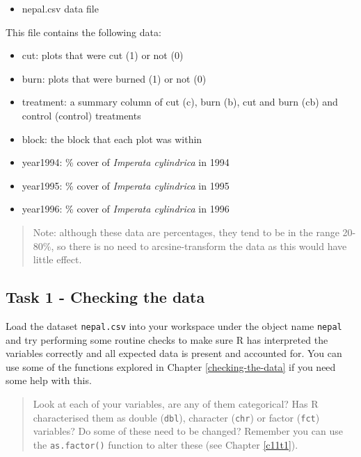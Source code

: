 \documentclass[
]{book}
\providecommand{\tightlist}{%
  \setlength{\itemsep}{0pt}\setlength{\parskip}{0pt}}
\begin{document}
\begin{itemize}
\tightlist
\item
  nepal.csv data file
\end{itemize}

This file contains the following data:

\begin{itemize}
\tightlist
\item
  cut: plots that were cut (1) or not (0)
\item
  burn: plots that were burned (1) or not (0)
\item
  treatment: a summary column of cut (c), burn (b), cut and burn (cb) and control (control) treatments
\item
  block: the block that each plot was within
\item
  year1994: \% cover of \emph{Imperata cylindrica} in 1994
\item
  year1995: \% cover of \emph{Imperata cylindrica} in 1995
\item
  year1996: \% cover of \emph{Imperata cylindrica} in 1996
\end{itemize}

\begin{quote}
Note: although these data are percentages, they tend to be in the range 20-80\%, so there is no need to arcsine-transform the data as this would have little effect.
\end{quote}

\hypertarget{task-1---checking-the-data-2}{%
\subsection{Task 1 - Checking the data}\label{task-1---checking-the-data-2}}

Load the dataset \texttt{nepal.csv} into your workspace under the object name \texttt{nepal} and try performing some routine checks to make sure R has interpreted the variables correctly and all expected data is present and accounted for. You can use some of the functions explored in Chapter \ref{checking-the-data} if you need some help with this.

\begin{quote}
Look at each of your variables, are any of them categorical? Has R characterised them as double (\texttt{dbl}), character (\texttt{chr}) or factor (\texttt{fct}) variables?
Do some of these need to be changed? Remember you can use the \texttt{as.factor()} function to alter these (see Chapter \ref{c11t1}).
\end{quote}
\end{document}

